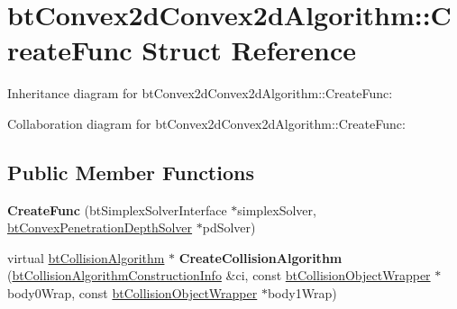 \hypertarget{structbt_convex2d_convex2d_algorithm_1_1_create_func}{\section{bt\+Convex2d\+Convex2d\+Algorithm\+:\+:Create\+Func Struct Reference}
\label{structbt_convex2d_convex2d_algorithm_1_1_create_func}
}


Inheritance diagram for bt\+Convex2d\+Convex2d\+Algorithm\+:\+:Create\+Func\+:


Collaboration diagram for bt\+Convex2d\+Convex2d\+Algorithm\+:\+:Create\+Func\+:
\subsection*{Public Member Functions}
\begin{DoxyCompactItemize}
\item 
\hypertarget{structbt_convex2d_convex2d_algorithm_1_1_create_func_a586664288c20c127a63f737d68914270}{{\bfseries Create\+Func} (bt\+Simplex\+Solver\+Interface $\ast$simplex\+Solver, \hyperlink{classbt_convex_penetration_depth_solver}{bt\+Convex\+Penetration\+Depth\+Solver} $\ast$pd\+Solver)}\label{structbt_convex2d_convex2d_algorithm_1_1_create_func_a586664288c20c127a63f737d68914270}

\item 
\hypertarget{structbt_convex2d_convex2d_algorithm_1_1_create_func_af99f63f7001eaff1010da77ae469cf65}{virtual \hyperlink{classbt_collision_algorithm}{bt\+Collision\+Algorithm} $\ast$ {\bfseries Create\+Collision\+Algorithm} (\hyperlink{structbt_collision_algorithm_construction_info}{bt\+Collision\+Algorithm\+Construction\+Info} \&ci, const \hyperlink{structbt_collision_object_wrapper}{bt\+Collision\+Object\+Wrapper} $\ast$body0\+Wrap, const \hyperlink{structbt_collision_object_wrapper}{bt\+Collision\+Object\+Wrapper} $\ast$body1\+Wrap)}\label{structbt_convex2d_convex2d_algorithm_1_1_create_func_af99f63f7001eaff1010da77ae469cf65}

\end{DoxyCompactItemize}
